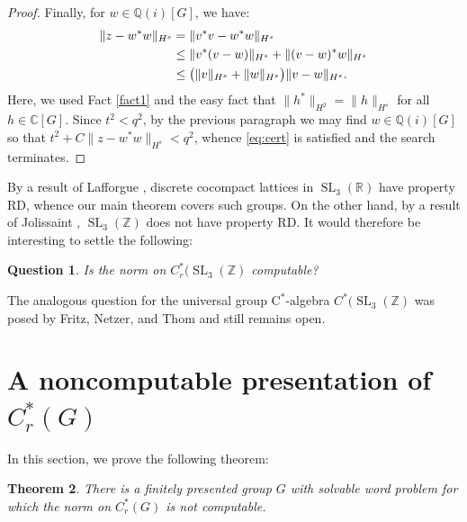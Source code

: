\documentclass{amsart}
\newcommand{\Q}{\mathbb{Q}}
\newcommand{\cstar}{$\mathrm{C}^*$}
\newcommand{\Qi}{\Q(i)}
\theoremstyle{plain}
\newtheorem{theorem}{Theorem}[section]
\newtheorem{question}[theorem]{Question}
\theoremstyle{definition}
\numberwithin{equation}{section}
\begin{document}
\begin{proof}
Finally, for $w\in \Qi[G]$, we have:
\begin{alignat}{2}
\|z-w^*w\|_{H^s}&=\|v^*v-w^*w\|_{H^s} \notag \\ \notag
    &\le\|v^*(v-w)\|_{H^s}+\|(v-w)^*w\|_{H^s}\\ \notag
&\le \big(\|v\|_{H^{s}}+\|w\|_{H^{s}}\big)\|v-w\|_{H^{s}}.\notag
\end{alignat}
Here, we used Fact \ref{fact1} and the easy fact that $\|h^*\|_{H^2}=\|h\|_{H^s}$ for all $h\in \mathbb{C}[G]$.  Since $t^2<q^2$, by the previous paragraph we may find $w\in \Qi[G]$ so that $t^2+C\|z-w^*w\|_{H^s}<q^2$, whence \eqref{eq:cert} is satisfied and the search terminates.
\end{proof}

By a result of Lafforgue \cite{lafforgue}, discrete cocompact lattices in $\operatorname{SL}_3(\mathbb{R})$ have property RD, whence our main theorem covers such groups.  On the other hand, by a result of Jolissaint \cite[Theorem B]{jolissaint}, $\operatorname{SL}_3(\mathbb{Z})$ does not have property RD.  It would therefore be interesting to settle the following:

\begin{question}
Is the norm on $C^*_r(\operatorname{SL}_3(\mathbb{Z})$ computable?
\end{question}

The analogous question for the universal group \cstar-algebra $C^*(\operatorname{SL}_3(\mathbb{Z})$ was posed by Fritz, Netzer, and Thom \cite[Question 2.6]{canyou} and still remains open.

\section{A noncomputable presentation of $C^*_r(G)$}

In this section, we prove the following theorem:

\begin{theorem}
There is a finitely presented group $G$ with solvable word problem for which the norm on $C^*_r(G)$ is not computable.
\end{theorem}
\end{document}
